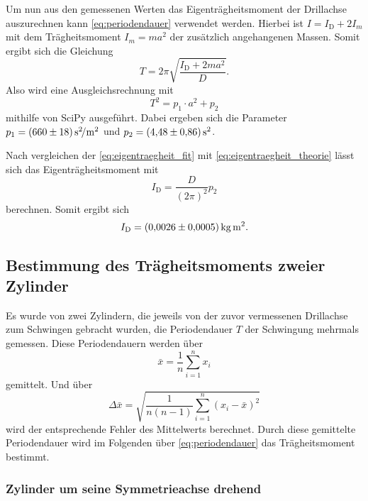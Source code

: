 Um nun aus den gemessenen Werten das Eigenträgheitsmoment der Drillachse auszurechnen kann \autoref{eq:periodendauer} verwendet werden. Hierbei ist $I=I_\text{D}+2I_m$ mit dem Trägheitsmoment $I_m=ma^2$ der zusätzlich angehangenen Massen. Somit ergibt sich die Gleichung
\begin{equation}
    T=2\pi \sqrt{\frac{I_\text{D}+2ma^2}{D}}.
    \label{eq:eigentraegheit_theorie}
\end{equation}
Also wird eine Ausgleichsrechnung mit
\begin{equation}
    T^2 = p_1 \cdot a^2 + p_2
    \label{eq:eigentraegheit_fit}
\end{equation}
mithilfe von SciPy ausgeführt.\cite{scipy} Dabei ergeben sich die Parameter $p_1=\SI{660+-18}{\second\squared\per\meter\squared}$ und $p_2=\SI{4.48+-0.86}{\second\squared}$. 

Nach vergleichen der \autoref{eq:eigentraegheit_fit} mit \autoref{eq:eigentraegheit_theorie} lässt sich das Eigenträgheitsmoment mit
\begin{equation}
    I_\text{D} = \frac{D}{(2\pi)^2}p_2
\end{equation}
berechnen. Somit ergibt sich
\begin{equation}
    I_\text{D} = \SI{0.0026+-0.0005}{\kilo\gram\meter\squared}.
\end{equation}

\subsection{Bestimmung des Trägheitsmoments zweier Zylinder}
\label{sec:zylinder}

Es wurde von zwei Zylindern, die jeweils von der zuvor vermessenen Drillachse zum Schwingen gebracht wurden, die Periodendauer $T$ der Schwingung mehrmals gemessen. Diese Periodendauern werden über
\begin{equation}
    \bar{x} = \frac{1}{n} \sum_{i=1}^n x_i
\end{equation}
gemittelt.
Und über 
\begin{equation}
    \Delta\bar{x} = \sqrt{\frac{1}{n(n-1)}\sum_{i=1}^n (x_i - \bar{x})^2}
\end{equation}
wird der entsprechende Fehler des Mittelwerts berechnet.
Durch diese gemittelte Periodendauer wird im Folgenden über \autoref{eq:periodendauer} das Trägheitsmoment bestimmt.

\subsubsection{Zylinder um seine Symmetrieachse drehend}
\label{sec:brauner_zylinder}

